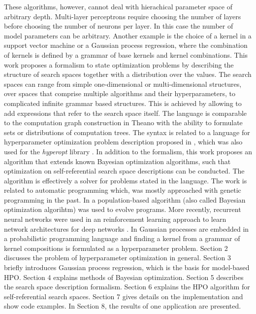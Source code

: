 \documentclass[english]{article}
\begin{document}
These algorithms, however, cannot deal with hierachical parameter space of arbitrary depth. Multi-layer perceptrons require choosing the number of layers before choosing the number of neurons per layer. In this case the number of model parameters can be arbitrary. Another example is the choice of a kernel in a support vector machine or a Gaussian process regression, where the combination of kernels is defined by a grammar of base kernels and kernel combinations.
This work proposes a formalism to state optimization problems by describing the structure of search spaces together with a distribution over the values. The search spaces can range from simple one-dimensional or multi-dimensional structures, over spaces that comprise multiple algorithms and their hyperparameters, to complicated infinite grammar based structures. This is achieved by allowing to add expressions that refer to the search space itself. The language is comparable to the computation graph construction in Theano with the ability to formulate sets or distributions of computation trees. The syntax is related to a language for hyperparameter optimization problem description proposed in \cite{bergstra_making_2013}, which was also used for the \textit{hyperopt} library \cite{bergstra_hyperopt:_2013}. In addition to the formalism, this work proposes an algorithm that extends known Bayesian optimization algorithms, such that optimization on self-referential search space descriptions can be conducted. The algorithm is effectively a solver for problems stated in the language.
The work is related to automatic programming which, was mostly approached with genetic programming in the past. In \cite{goertzel_learning_2005} a population-based algorithm (also called Bayesian optimization algorihtm) was used to evolve programs. More recently, recurrent neural networks were used in an reinforcement learning approach to learn network architectures for deep networks \cite{zoph_neural_2016}. In \cite{schaechtle_probabilistic_2015} Gaussian processes are embedded in a probabilistic programming language and finding a kernel from a grammar of kernel compositions is formulated as a hyperparameter problem.
Section 2 discusses the problem of hyperparameter optimization in general.
Section 3 briefly introduces Gaussian process regression, which is the basis for model-based HPO.
Section 4 explains methods of Bayesian optimization.
Section 5 describes the search space description formalism.
Section 6 explains the HPO algorithm for self-referential search spaces.
Section 7 gives details on the implementation and show code examples.
In Section 8, the results of one application are presented.
\end{document}
